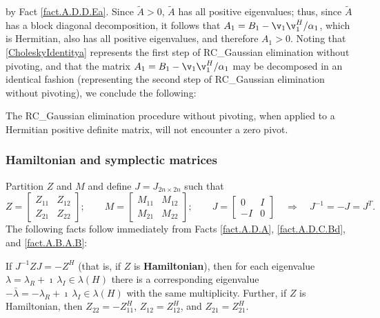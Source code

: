 by Fact \ref{fact.A.D.D.Ea}.  Since $\tilde A>0$, $\tilde A$ has all positive eigenvalues; thus, since $\tilde A$ has a block diagonal decomposition,
it follows that $A_1=B_1-\v_1 \v_1^H/ \alpha_1$, which is Hermitian, also has all positive eigenvalues, and therefore $A_1>0$.  Noting that \eqref{CholeskyIdentitya}
represents the first step of RC_Gaussian elimination without pivoting, and that the matrix $A_1=B_1-\v_1 \v_1^H/ \alpha_1$ may be decomposed in an identical fashion (representing
the second step of RC_Gaussian elimination without pivoting), we conclude the following:

\begin{fact} \label{fact.A.D.D.Eg}
The RC_Gaussian elimination procedure without pivoting, when applied to a Hermitian positive definite matrix, will not encounter a zero pivot.
\end{fact}

\subsubsection{Hamiltonian and symplectic matrices} \label{sec.A.D.D.B}

Partition $Z$ and $M$ and define $J=J_{2n\times 2n}$ such that
\begin{equation*}
Z = \begin{bmatrix} Z_{11} & Z_{12} \\ Z_{21} & Z_{22} \end{bmatrix}; \qquad
M = \begin{bmatrix} M_{11} & M_{12} \\ M_{21} & M_{22} \end{bmatrix}; \qquad
J = \begin{bmatrix} 0 & I \\ -I & 0 \end{bmatrix} \quad \Rightarrow \quad J^{-1} = - J = J^T.
\end{equation*}
The following facts follow immediately from Facts \ref{fact.A.D.A}, \ref{fact.A.D.C.Bd}, and \ref{fact.A.B.A.B}:

\begin{fact} \label{fact.A.D.D.Ec}
If $J^{-1} Z J = -Z^H$ (that is, if $Z$ is {\bf Hamiltonian}),
then for each eigenvalue $\lambda= \lambda_{R}+\imath\,\lambda_{I} \in \lambda(H)$
there is a corresponding eigenvalue $-\bar\lambda = -\lambda_{R}+\imath\,\lambda_{I} \in \lambda(H)$
with the same multiplicity.  Further, if $Z$ is Hamiltonian, then $Z_{22}=-Z_{11}^H$, $Z_{12}=Z_{12}^H$, and $Z_{21}=Z_{21}^H$.
\end{fact}

